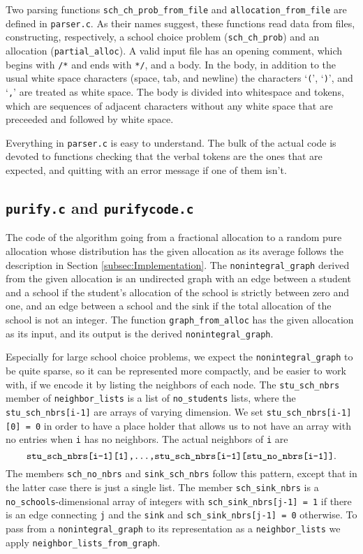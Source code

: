 \documentclass[12pt]{article}
\theoremstyle{definition}
\begin{document}
\begin{appendix}
Two parsing functions \texttt{sch\_ch\_prob\_from\_file} and
\texttt{allocation\_from\_file} are defined in \texttt{parser.c}.  As
their names suggest, these functions read data from files,
constructing, respectively, a school choice problem
(\texttt{sch\_ch\_prob}) and an allocation (\texttt{partial\_alloc}).
A valid input file has an opening comment, which begins with
\texttt{/*} and ends with \texttt{*/}, and a body.  In the body, in
addition to the usual white space characters (space, tab, and newline)
the characters `\texttt{(}', `\texttt{)}', and `\texttt{,}' are
treated as white space.  The body is divided into whitespace and
tokens, which are sequences of adjacent characters without any white
space that are preceeded and followed by white space.

Everything in \texttt{parser.c} is easy to understand.  The bulk of
the actual code is devoted to functions checking that the verbal
tokens are the ones that are expected, and quitting with an error
message if one of them isn't.

\subsection{\texttt{purify.c} and \texttt{purifycode.c}}

The code of the algorithm going from a fractional allocation to a
random pure allocation whose distribution has the given allocation as
its average follows the description in Section
\ref{subsec:Implementation}.  The \texttt{nonintegral\_graph} derived
from the given allocation is an undirected graph with an edge between
a student and a school if the student's allocation of the school is
strictly between zero and one, and an edge between a school and the
sink if the total allocation of the school is not an integer.  The
function \texttt{graph\_from\_alloc} has the given allocation as its
input, and its output is the derived \texttt{nonintegral\_graph}.

Especially for large school choice problems, we expect the
\texttt{nonintegral\_graph} to be quite sparse, so it can be
represented more compactly, and be easier to work with, if we encode
it by listing the neighbors of each node.  The \texttt{stu\_sch\_nbrs}
member of \texttt{neighbor\_lists} is a list of \texttt{no\_students}
lists, where the \texttt{stu\_sch\_nbrs[i-1]} are arrays of varying
dimension. We set \texttt{stu\_sch\_nbrs[i-1][0] = 0} in order to have
a place holder that allows us to not have an array with no entries
when \texttt{i} has no neighbors.  The actual neighbors of \texttt{i}
are
$$\text{\texttt{stu\_sch\_nbrs[i-1][1],...,stu\_sch\_nbrs[i-1][stu\_no\_nbrs[i-1]]}}.$$
The members \texttt{sch\_no\_nbrs} and \texttt{sink\_sch\_nbrs} follow
this pattern, except that in the latter case there is just a single
list.  The member \texttt{sch\_sink\_nbrs} is a
\texttt{no\_schools}-dimensional array of integers with
\texttt{sch\_sink\_nbrs[j-1] = 1} if there is an edge connecting
\texttt{j} and the \texttt{sink} and \texttt{sch\_sink\_nbrs[j-1] = 0}
otherwise.  To pass from a \texttt{nonintegral\_graph} to its
representation as a \texttt{neighbor\_lists} we apply
\texttt{neighbor\_lists\_from\_graph}.


\end{appendix}
\end{document}

